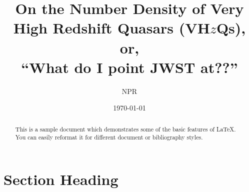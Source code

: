 \documentclass[11pt,a4paper]{article}
\begin{document}
\title{On the Number Density of Very High Redshift Quasars (VH$z$Qs), or, \\
``What do I point JWST at??''}
\author{NPR}
\date{\today}
\maketitle



\begin{abstract}
This is a sample document which demonstrates some of the basic features
of \LaTeX.  You can easily reformat it for different document 
or bibliography styles.
\end{abstract}




\section{Section Heading}
\end{document}
